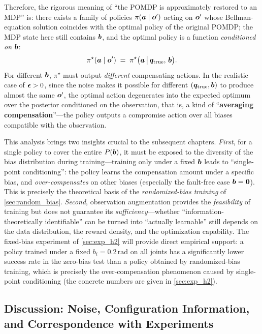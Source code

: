 Therefore, the rigorous meaning of ``the POMDP is approximately restored to an MDP'' is: there exists a family of policies $\pi(\bm{a} \mid \bm{o}')$ acting on $\bm{o}'$ whose Bellman-equation solution coincides with the optimal policy of the original POMDP; the MDP state here still contains $\bm{b}$, and the optimal policy is a function \emph{conditioned on $\bm{b}$}:
\begin{equation}
  \pi^\star(\bm{a} \mid \bm{o}') \;=\; \pi^\star\big(\bm{a} \,\big|\, \bm{q}_{\text{true}},\,\bm{b}\big).
  \label{eq:conditional_policy}
\end{equation}
For different $\bm{b}$, $\pi^\star$ must output \emph{different} compensating actions. In the realistic case of $\bm{\epsilon} > 0$, since the noise makes it possible for different $(\bm{q}_{\text{true}}, \bm{b})$ to produce almost the same $\bm{o}'$, the optimal action degenerates into the expected optimum over the posterior conditioned on the observation, that is, a kind of ``\textbf{averaging compensation}''---the policy outputs a compromise action over all biases compatible with the observation.

This analysis brings two insights crucial to the subsequent chapters. \emph{First}, for a single policy to cover the entire $P(\bm{b})$, it must be exposed to the diversity of the bias distribution during training---training only under a fixed $\bm{b}$ leads to ``single-point conditioning'': the policy learns the compensation amount under a specific bias, and \emph{over-compensates} on other biases (especially the fault-free case $\bm{b}=\bm{0}$). This is precisely the theoretical basis of the \emph{randomized-bias training} of \cref{sec:random_bias}. \emph{Second}, observation augmentation provides the \emph{feasibility} of training but does not guarantee its \emph{sufficiency}---whether ``information-theoretically identifiable'' can be turned into ``actually learnable'' still depends on the data distribution, the reward density, and the optimization capability. The fixed-bias experiment of \cref{sec:exp_h2} will provide direct empirical support: a policy trained under a fixed $b_i = 0.2\,\text{rad}$ on all joints has a significantly lower success rate in the zero-bias test than a policy obtained by randomized-bias training, which is precisely the over-compensation phenomenon caused by single-point conditioning (the concrete numbers are given in \cref{sec:exp_h2}).

\subsection{Discussion: Noise, Configuration Information, and Correspondence with Experiments}\label{subsec:observability_discussion}

